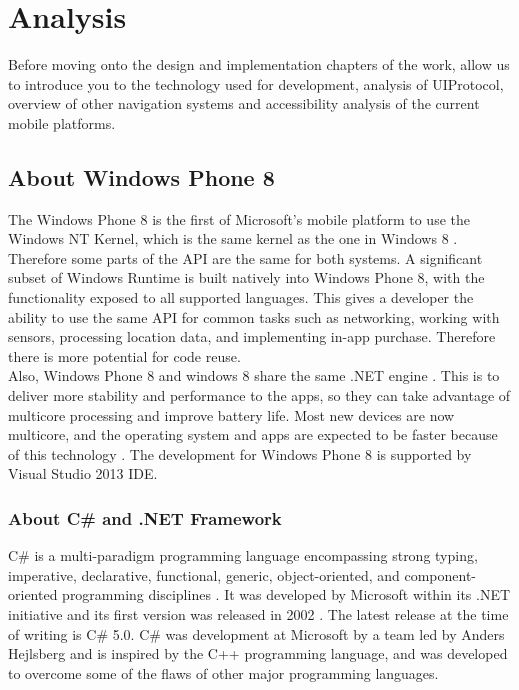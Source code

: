 \chapter{Analysis}
Before moving onto the design and implementation chapters of the work, allow us to introduce you to the technology used for development, analysis of UIProtocol, overview of other navigation systems and accessibility analysis of the current mobile platforms.


\section{About Windows Phone 8}
The Windows Phone 8 is the first of Microsoft's mobile platform to use the Windows NT Kernel, which is the same kernel as the one in Windows 8 \cite{wp8kernel}. Therefore some parts of the API are the same for both systems. A significant subset of Windows Runtime is built natively into Windows Phone 8, with the functionality exposed to all supported languages. This gives a developer the ability to use the same API for common tasks such as networking, working with sensors, processing location data, and implementing in-app purchase. Therefore there is more potential for code reuse.\\
Also, Windows Phone 8 and windows 8 share the same .NET engine \cite{wp8comparison}. This is to deliver more stability and performance to the apps, so they can take advantage of multicore processing and improve battery life. Most new devices are now multicore, and the operating system and apps are expected to be faster because of this technology \cite{wp8comparison}. The development for Windows Phone 8 is supported by Visual Studio 2013 IDE.

\subsection{About C\# and .NET Framework}
C\# is a multi-paradigm programming language encompassing strong typing, imperative, declarative, functional, generic, object-oriented, and component-oriented programming disciplines \cite{cs1.0specs}. It was developed by Microsoft within its .NET initiative and its first version was released in 2002 \cite{cs1.0specs}. The latest release at the time of writing is C\# 5.0.
C\# was development at Microsoft by a team led by Anders Hejlsberg and is inspired by the C++ programming language, and was developed to overcome some of the flaws of other major programming languages.




